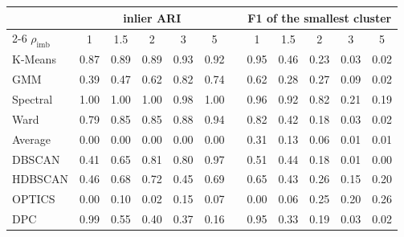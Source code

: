 \begin{tabular}{@{}lccccccccccc@{}}
\toprule
 & \multicolumn{5}{c}{inlier ARI} & & \multicolumn{5}{c}{F1 of the smallest cluster} \\
\cmidrule{2-6}\cmidrule{8-12}
$\rho_{\text{imb}}$ & 1 & 1.5 & 2 & 3 & 5 & & 1 & 1.5 & 2 & 3 & 5 \\
\midrule
K-Means & 0.87 & 0.89 & 0.89 & 0.93 & 0.92 & & 0.95 & 0.46 & 0.23 & 0.03 & 0.02 \\
GMM & 0.39 & 0.47 & 0.62 & 0.82 & 0.74 & & 0.62 & 0.28 & 0.27 & 0.09 & 0.02 \\
Spectral & 1.00 & 1.00 & 1.00 & 0.98 & 1.00 & & 0.96 & 0.92 & 0.82 & 0.21 & 0.19 \\
Ward & 0.79 & 0.85 & 0.85 & 0.88 & 0.94 & & 0.82 & 0.42 & 0.18 & 0.03 & 0.02 \\
Average & 0.00 & 0.00 & 0.00 & 0.00 & 0.00 & & 0.31 & 0.13 & 0.06 & 0.01 & 0.01 \\
DBSCAN & 0.41 & 0.65 & 0.81 & 0.80 & 0.97 & & 0.51 & 0.44 & 0.18 & 0.01 & 0.00 \\
HDBSCAN & 0.46 & 0.68 & 0.72 & 0.45 & 0.69 & & 0.65 & 0.43 & 0.26 & 0.15 & 0.20 \\
OPTICS & 0.00 & 0.10 & 0.02 & 0.15 & 0.07 & & 0.00 & 0.06 & 0.25 & 0.20 & 0.26 \\
DPC & 0.99 & 0.55 & 0.40 & 0.37 & 0.16 & & 0.95 & 0.33 & 0.19 & 0.03 & 0.02 \\
\bottomrule
\end{tabular}
